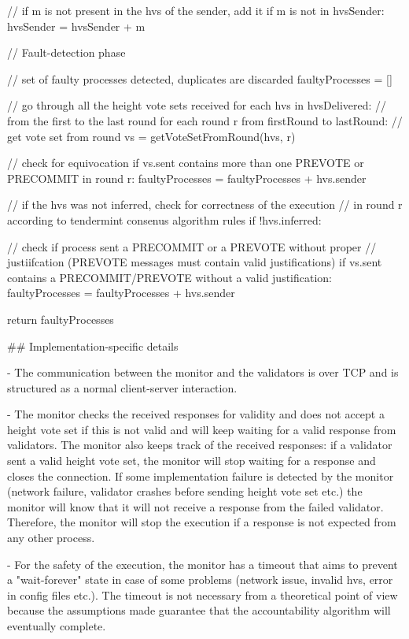 \documentclass[a4paper,11pt,oneside]{report}
\begin{document}
\begin{markdown}
                // if m is not present in the hvs of the sender, add it
                if m is not in hvsSender:
                    hvsSender = hvsSender + m
                    
        // Fault-detection phase
        
        // set of faulty processes detected, duplicates are discarded
        faultyProcesses = []
        
        // go through all the height vote sets received
        for each hvs in hvsDelivered:
            // from the first to the last round    
            for each round r from firstRound to lastRound: 
                // get vote set from round
                vs = getVoteSetFromRound(hvs, r)
                
                // check for equivocation
                if vs.sent contains more than one PREVOTE or PRECOMMIT in round r:
                    faultyProcesses = faultyProcesses + hvs.sender                
                
                // if the hvs was not inferred, check for correctness of the execution
                // in round r according to tendermint consenus algorithm rules  
                if !hvs.inferred:
                    
                    // check if process sent a PRECOMMIT or a PREVOTE without proper
                    // justiifcation (PREVOTE messages must contain valid justifications) 
                    if vs.sent contains a PRECOMMIT/PREVOTE without a valid justification:
                        faultyProcesses = faultyProcesses + hvs.sender
                        
                        
        return faultyProcesses
        
                
## Implementation-specific details

- The communication between the monitor and the validators is over TCP and is structured as a normal client-server interaction.  

- The monitor checks the received responses for validity and does not accept a height vote set if this is not valid and will keep waiting for a valid response from validators. 
The monitor also keeps track of the received responses: if a validator sent a valid height vote set, the monitor will stop waiting for a response and closes the connection.
If some implementation failure is detected by the monitor (network failure, validator crashes before sending height vote set etc.) the monitor will know that it will not receive a response from the failed validator. 
Therefore, the monitor will stop the execution if a response is not expected from any other process. 

- For the safety of the execution, the monitor has a timeout that aims to prevent a "wait-forever" state in case of some problems (network issue, invalid hvs, error in config files etc.). The timeout is not necessary from a theoretical point of view because the assumptions made guarantee that the accountability algorithm will eventually complete.

\end{markdown}
\end{document}

